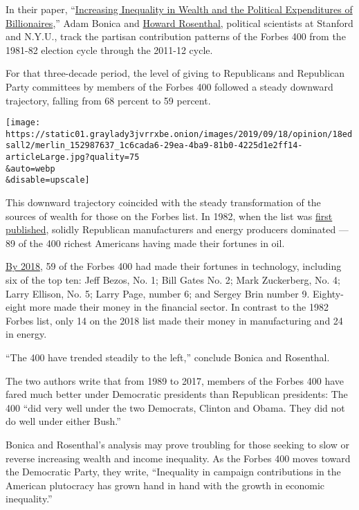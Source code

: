 In their paper,
``\href{https://papers.ssrn.com/sol3/papers.cfm?abstract_id=2668780}{Increasing
Inequality in Wealth and the Political Expenditures of Billionaires},''
Adam Bonica and
\href{http://as.nyu.edu/content/nyu-as/as/faculty/howard-l-rosenthal.html}{Howard
Rosenthal}, political scientists at Stanford and N.Y.U., track the
partisan contribution patterns of the Forbes 400 from the 1981-82
election cycle through the 2011-12 cycle.

For that three-decade period, the level of giving to Republicans and
Republican Party committees by members of the Forbes 400 followed a
steady downward trajectory, falling from 68 percent to 59 percent.

\texttt{[image: https://static01.graylady3jvrrxbe.onion/images/2019/09/18/opinion/18edsall2/merlin\_152987637\_1c6cada6-29ea-4ba9-81b0-4225d1e2ff14-articleLarge.jpg?quality=75\\\&auto=webp\\\&disable=upscale]}

This downward trajectory coincided with the steady transformation of the
sources of wealth for those on the Forbes list. In 1982, when the list
was \href{https://www.verdict.co.uk/forbes-100th-birthday/}{first
published}, solidly Republican manufacturers and energy producers
dominated --- 89 of the 400 richest Americans having made their fortunes
in oil.

\href{https://www.forbes.com/forbes-400/\#1dcfc44d7e2f}{By 2018}, 59 of
the Forbes 400 had made their fortunes in technology, including six of
the top ten: Jeff Bezos, No. 1; Bill Gates No. 2; Mark Zuckerberg, No.
4; Larry Ellison, No. 5; Larry Page, number 6; and Sergey Brin number 9.
Eighty-eight more made their money in the financial sector. In contrast
to the 1982 Forbes list, only 14 on the 2018 list made their money in
manufacturing and 24 in energy.

``The 400 have trended steadily to the left,'' conclude Bonica and
Rosenthal.

The two authors write that from 1989 to 2017, members of the Forbes 400
have fared much better under Democratic presidents than Republican
presidents: The 400 ``did very well under the two Democrats, Clinton and
Obama. They did not do well under either Bush.''

Bonica and Rosenthal's analysis may prove troubling for those seeking to
slow or reverse increasing wealth and income inequality. As the Forbes
400 moves toward the Democratic Party, they write, ``Inequality in
campaign contributions in the American plutocracy has grown hand in hand
with the growth in economic inequality.''

